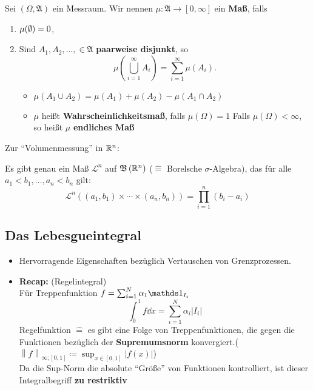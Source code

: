 \begin{definition}
	Sei $ (\Omega, \mathfrak{A} ) $ ein Messraum.
	Wir nennen $ \mu : \mathfrak{A} \to [0, \infty]  $ ein \textbf{Maß}, falls
	\begin{enumerate}[label=(\roman*)]
		\item $ \mu ( \emptyset ) = 0 $,
		\item Sind $ A_1, A_2, \dotsc, \in \mathfrak{A}  $ \textbf{paarweise disjunkt}, so
			\[
				\mu \left( \bigcup_{i = 1} ^{\infty} A_i \right) = \sum_{i=1}^{\infty} \mu(A_i).
			\]
			\begin{itemize}
				\item $ \mu (A_1 \cup A_2) = \mu(A_1) + \mu(A_2) - \mu(A_1 \cap A_2) $
				\item $ \mu $ heißt \textbf{Wahrscheinlichkeitsmaß}, falls $ \mu(\Omega) = 1 $
					Falls $ \mu(\Omega) < \infty $, so heißt $ \mu $ \textbf{endliches Maß}
			\end{itemize}
	\end{enumerate}
\end{definition}

Zur ``Volumenmessung'' in $ \mathbb{R} ^n $:
\begin{theorem}
	Es gibt  genau ein Maß $ \mathcal{L} ^n $ auf $ \mathfrak{B} \left( \mathbb{R} ^n \right)  $ ($ \hat{=}  $ Borelsche $ \sigma $-Algebra), das für alle $ a_1 <b_1, \dotsc, a_n < b_n $ gilt:
	\[
		\mathcal{L} ^n \left( (a_1, b_1) \times \dotsb \times (a_n, b_n) \right) = \prod_{i=1}^{n} (b_i - a_i) 
	\]
\end{theorem}

\subsection{Das Lebesgueintegral}
\begin{itemize}
	\item Hervorragende Eigenschaften bezüglich Vertauschen von Grenzprozessen.
	\item \textbf{Recap:} (Regelintegral)\\
		Für Treppenfunktion $ f = \sum_{i=1}^{N} \alpha_1 \I_{I_i} $
		\[
			\int_{0}^{1}f \dd x = \sum_{i=1}^{N} \alpha_i \left| I_i \right| 
		\]
		Regelfunktion $ \hat{=}  $ es gibt eine Folge von Treppenfunktionen, die gegen die Funktionen bezüglich der \textbf{Supremumsnorm} konvergiert.($ \left\| f \right\| _{\infty;[0, 1]} \coloneqq \sup_{x \in [0, 1]} \left| f(x) \right|  $)\\
		Da die Sup-Norm die absolute ``Größe'' von Funktionen kontrolliert, ist dieser Integralbegriff \textbf{zu restriktiv}
\end{itemize}

